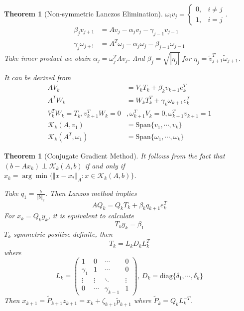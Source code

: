 \documentclass[12pt,b5paper,notitlepage]{article}
\theoremstyle{definition}
\theoremstyle{remark}
\theoremstyle{plain}
\newtheorem{theorem}[definition]{Theorem}
\newcommand{\diag}{\mathrm{diag}}
\newcommand{\Span}{\mathrm{Span}}
\newcommand{\dps}{\displaystyle}
\numberwithin{equation}{section}
\renewcommand{\|}{\Vert}
\begin{document}
\begin{theorem}[Non-symmetric Lanczos Elimination]
     $ \omega_iv_j=\begin{cases}
        0,&i\neq j\\
        1,&i=j
     \end{cases} $.
    \begin{align*}
        \beta_jv_{j+1}&=Av_j-\alpha_jv_j-\gamma_{j-1}v_{j-1}\\
        \gamma_{j}\omega_{j+!}&=A^T\omega_j-\alpha_j\omega_j-\beta_{j-1}\omega_{j-1}
    \end{align*} 
    Take inner product we obain  $ \alpha_j=\omega_j^TAv_j $.
    And  $ \beta_j=\sqrt{|\eta_j|} $ for  $ \eta_j=\tilde{v}_{j+1}^T\tilde{\omega}_{j+1} $.   

    It can be derived from 
    \begin{align*}
        AV_k&=V_kT_k+\beta_kv_{k+1}e_k^T\\
        A^TW_k&=W_kT_k^T+\gamma_k\omega_{k+1}e_k^T\\
        V_k^TW_k=T_k,v_{k+1}^TW_k=0&,\omega_{k+1}^TV_k=0,\omega_{k+1}^Tv_{k+1}=1\\
        \mathcal{K}_k(A,v_1)&=\Span\{v_1,\cdots,v_k\}\\
        \mathcal{K}_k(A^T,\omega_1)&=\Span\{\omega_1,\cdots,\omega_k\}
    \end{align*}
\end{theorem}
\begin{theorem}[Conjugate Gradient Method]
    It follows from the fact that  $ (b-Ax_k)\perp \mathcal{K}_k(A,b) $ if and only if  $ x_k=\arg \min\{\|x-x_*\|_A:x\in \mathcal{K}_k(A,b)\} $.
    
    Take  $ q_1=\dps\frac{b}{\|b\|_2} $. Then Lanzos method implies 
    \[AQ_k=Q_kT_k+\beta_kq_{k+1}e_k^T\] 
    For  $ x_k=Q_ky_k $, it is equivalent to calculate
    \[T_ky_k=\beta_1\]
     $ T_k $ symmetric positive definite, then 
     \[T_k=L_kD_kL_k^T\]
     where 
     \[L_k=\begin{pmatrix}
        1&0&\cdots&0\\
        \gamma_1&1&\cdots&0\\
        \vdots&\vdots&\ddots&\vdots\\
        0&\cdots&\gamma_{k-1}&1
     \end{pmatrix},\,D_k=\diag\{\delta_1,\cdots,\delta_k\}\] 
     Then  $ x_{k+1}=\tilde{P}_{k+1}z_{k+1}=x_k+\zeta_{k+1}\tilde{p}_{k+1} $ where  $ \tilde{P}_k=Q_kL_k^{-T} $.   
\end{theorem}
\end{document}
